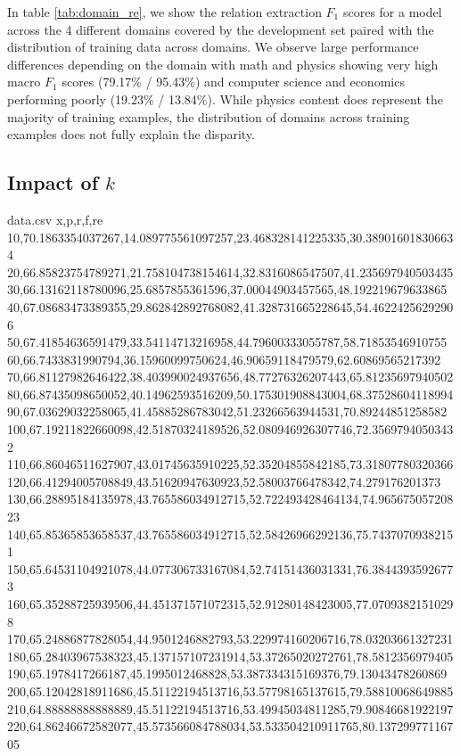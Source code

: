 \documentclass[11pt]{article}
\begin{document}
In table \ref{tab:domain_re}, we show the relation extraction $F_1$ scores for a model across the 4 different domains covered by the development set paired with the distribution of training data across domains.
We observe large performance differences depending on the domain with math and physics showing very high macro $F_1$ scores (79.17\% / 95.43\%) and computer science and economics performing poorly (19.23\% / 13.84\%).
While physics content does represent the majority of training examples, the distribution of domains across training examples does not fully explain the disparity.

\subsection{Impact of $k$}

\begin{filecontents*}{data.csv}
x,p,r,f,re
10,70.1863354037267,14.089775561097257,23.468328141225335,30.389016018306634
20,66.85823754789271,21.758104738154614,32.8316086547507,41.235697940503435
30,66.13162118780096,25.6857855361596,37.00044903457565,48.192219679633865
40,67.08683473389355,29.862842892768082,41.328731665228645,54.46224256292906
50,67.41854636591479,33.54114713216958,44.79600333055787,58.71853546910755
60,66.7433831990794,36.15960099750624,46.90659118479579,62.60869565217392
70,66.81127982646422,38.403990024937656,48.77276326207443,65.81235697940502
80,66.87435098650052,40.14962593516209,50.175301908843004,68.37528604118994
90,67.03629032258065,41.45885286783042,51.23266563944531,70.89244851258582
100,67.19211822660098,42.51870324189526,52.080946926307746,72.35697940503432
110,66.86046511627907,43.01745635910225,52.35204855842185,73.31807780320366
120,66.41294005708849,43.51620947630923,52.58003766478342,74.279176201373
130,66.28895184135978,43.765586034912715,52.722493428464134,74.96567505720823
140,65.85365853658537,43.765586034912715,52.58426966292136,75.74370709382151
150,65.64531104921078,44.077306733167084,52.74151436031331,76.38443935926773
160,65.35288725939506,44.451371571072315,52.91280148423005,77.07093821510298
170,65.24886877828054,44.9501246882793,53.229974160206716,78.03203661327231
180,65.28403967538323,45.137157107231914,53.37265020272761,78.5812356979405
190,65.1978417266187,45.1995012468828,53.387334315169376,79.13043478260869
200,65.12042818911686,45.51122194513716,53.57798165137615,79.58810068649885
210,64.88888888888889,45.51122194513716,53.49945034811285,79.90846681922197
220,64.86246672582077,45.573566084788034,53.533504210911765,80.13729977116705

\end{filecontents*}
\end{document}
